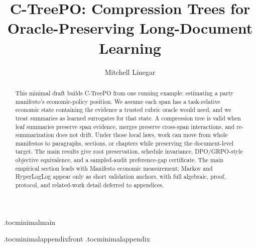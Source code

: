 \documentclass[11pt]{article}
\title{C-TreePO: Compression Trees for Oracle-Preserving Long-Document Learning}
\author{Mitchell Linegar}
\date{}
\begin{document}
\maketitle

\begin{abstract}
This minimal draft builds C-TreePO from one running example: estimating a
party manifesto's economic-policy position. We assume each span has a
task-relative economic state containing the evidence a trusted rubric oracle
would need, and we treat summaries as learned surrogates for that state. A
compression tree is valid when leaf summaries preserve span evidence, merges
preserve cross-span interactions, and re-summarization does not drift. Under
those local laws, work can move from whole manifestos to paragraphs, sections,
or chapters while preserving the document-level target. The main results give
root preservation, schedule invariance, DPO/GRPO-style objective equivalence,
and a sampled-audit preference-gap certificate. The main empirical section
leads with Manifesto economic measurement; Markov and HyperLogLog appear only
as short validation anchors, with full algebraic, proof, protocol, and
related-work detail deferred to appendices.
\end{abstract}

\tableofcontents
\clearpage

\etocdepthtag.toc{minimalmain}











\appendix
\etocdepthtag.toc{minimalappendixfront}
\appendixcontents
\etocdepthtag.toc{minimalappendix}











\clearpage


\end{document}
